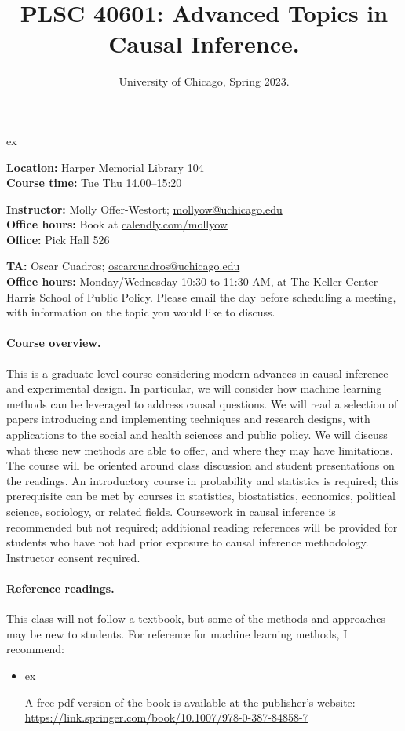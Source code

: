 \documentclass[letterpaper, 12pt, parskip=full,DIV=10]{scrartcl}
\title{PLSC 40601: Advanced Topics in Causal Inference.}
\subtitle{University of Chicago, Spring 2023.}
\date{}
\author{}
\begin{document}
\maketitle

 ex

\textbf{Location:} Harper Memorial Library 104\\
\textbf{Course time:} Tue Thu 14.00--15:20


\textbf{Instructor:} Molly Offer-Westort; \href{mailto:mollyow@uchicago.edu}{mollyow@uchicago.edu}\\
\textbf{Office hours:} Book at \href{https://calendly.com/mollyow}{calendly.com/mollyow}\\
\textbf{Office:} Pick Hall 526 

\textbf{TA:} Oscar Cuadros; \href{mailto:oscarcuadros@uchicago.edu }{oscarcuadros@uchicago.edu}\\
\textbf{Office hours:} Monday/Wednesday 10:30 to 11:30 AM, at The Keller Center - Harris School of Public Policy. Please email the day before scheduling a meeting, with information on the topic you would like to discuss.


\paragraph{Course overview.} This is a graduate-level course considering modern advances in causal inference and experimental design. In particular, we will consider how machine learning methods can be leveraged to address causal questions. We will read a selection of papers introducing and implementing techniques and research designs, with applications to the social and health sciences and public policy. We will discuss what these new methods are able to offer, and where they may have limitations. The course will be oriented around class discussion and student presentations on the readings. An introductory course in probability and statistics is required; this prerequisite can be met by courses in statistics, biostatistics, economics, political science, sociology, or related fields. Coursework in causal inference is recommended but not required; additional reading references will be provided for students who have not had prior exposure to causal inference methodology. Instructor consent required.


\paragraph{Reference readings.}
This class will not follow a textbook, but some of the methods and approaches may be new to students. For reference for machine learning methods, I recommend:
\begin{itemize}
\item {}  ex

A free pdf version of the book is available at the publisher's website: \url{https://link.springer.com/book/10.1007/978-0-387-84858-7}
\end{itemize}
\end{document}
